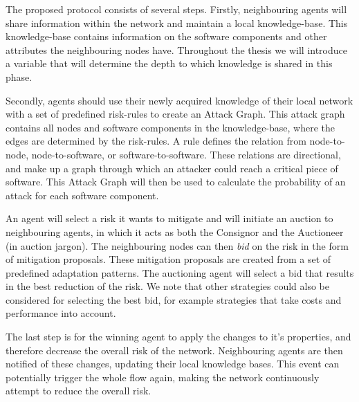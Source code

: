 The proposed protocol consists of several steps. Firstly, neighbouring agents will share information within the network and maintain a local knowledge-base. This knowledge-base contains information on the software components and other attributes the neighbouring nodes have. Throughout the thesis we will introduce a variable that will determine the depth to which knowledge is shared in this phase. 

Secondly, agents should use their newly acquired knowledge of their local network with a set of predefined risk-rules to create an Attack Graph. This attack graph contains all nodes and software components in the knowledge-base, where the edges are determined by the risk-rules. A rule defines the relation from node-to-node, node-to-software, or software-to-software. These relations are directional, and make up a graph through which an attacker could reach a critical piece of software. This Attack Graph will then be used to calculate the probability of an attack for each software component. 

An agent will select a risk it wants to mitigate and will initiate an auction to neighbouring agents, in which it acts as both the Consignor and the Auctioneer (in auction jargon).  
The neighbouring nodes can then \emph{bid} on the risk in the form of mitigation proposals. These mitigation proposals are created from a set of predefined adaptation patterns. The auctioning agent will select a bid that results in the best reduction of the risk. We note that other strategies could also be considered for selecting the best bid, for example strategies that take costs and performance into account.

The last step is for the winning agent to apply the changes to it's properties, and therefore decrease the overall risk of the network. Neighbouring agents are then notified of these changes, updating their local knowledge bases. This event can potentially trigger the whole flow again, making the network continuously attempt to reduce the overall risk.